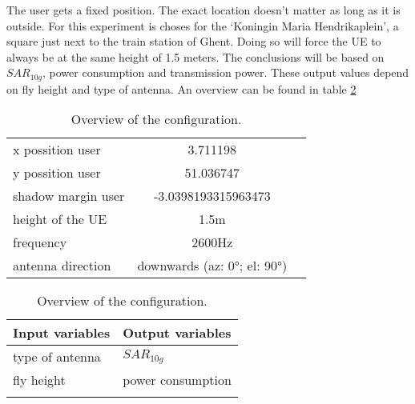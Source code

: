 The user gets a fixed position. The exact location doesn't matter as long as it is outside. For this experiment is choses for the 
`Koningin Maria Hendrikaplein', a square just next to the train station of Ghent.  Doing so will force the \gls{UE} 
to always be at the same height of 1.5 meters. The conclusions will be based on $SAR_{10g}$, power consumption and transmission power.
These output values depend on fly height and type of antenna. An overview can be found in table \ref{table:confOverviewScenario1}

\begin{table}[!htb]
    \begin{minipage}{.5\linewidth}
      \centering
        \begin{tabular}{|l|c|l|}
        \hline
        x possition user               & 3.711198       \\    
        y possition user               & 51.036747          \\ 
        shadow margin user             & -3.0398193315963473 \\
        height of the \gls{UE}         & 1.5m                      \\ 
        frequency                      & 2600Hz                   \\ 
        antenna  direction             & downwards (az: \ang{0}; el: \ang{90})    \\ 
        \hline
        \end{tabular}
    \end{minipage}%
    \begin{minipage}{.5\linewidth}
      \centering
            \begin{tabular}{|l|l|}
            \hline
            Input variables                & Output variables          \\   \hline 
            type of antenna                & $SAR_{10g}$               \\ 
            fly height                     & power consumption             \\ 
               &   \\ 
            \hline
            \end{tabular}
    \end{minipage} 
        \caption{Overview of the configuration.}
        \label{table:confOverviewScenario1}
\end{table}





